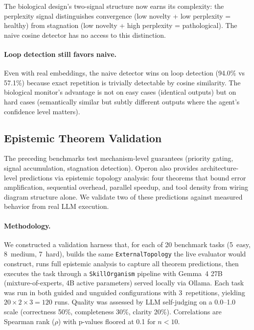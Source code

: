 The biological design's two-signal structure now earns its complexity:
the perplexity signal distinguishes convergence (low novelty + low
perplexity = healthy) from stagnation (low novelty + high perplexity =
pathological).  The naive cosine detector has no access to this
distinction.

\paragraph{Loop detection still favors naive.}
Even with real embeddings, the naive detector wins on loop detection
(94.0\% vs 57.1\%) because exact repetition is trivially detectable by
cosine similarity.  The biological monitor's advantage is not on easy
cases (identical outputs) but on hard cases (semantically similar but
subtly different outputs where the agent's confidence level matters).

\subsection{Epistemic Theorem Validation}\label{sec:topology-validation}

The preceding benchmarks test mechanism-level guarantees (priority
gating, signal accumulation, stagnation detection).  Operon also
provides architecture-level predictions via epistemic topology analysis:
four theorems that bound error amplification, sequential overhead,
parallel speedup, and tool density from wiring diagram structure alone.
We validate two of these predictions against measured behavior from real
LLM execution.

\paragraph{Methodology.}
We constructed a validation harness that, for each of 20 benchmark tasks
(5~easy, 8~medium, 7~hard), builds the same \texttt{ExternalTopology}
the live evaluator would construct, runs full epistemic analysis to
capture all theorem predictions, then executes the task through a
\texttt{SkillOrganism} pipeline with Gemma~4 27B (mixture-of-experts,
4B active parameters) served locally via Ollama.  Each task was run in
both guided and unguided configurations with 3~repetitions, yielding
$20 \times 2 \times 3 = 120$ runs.  Quality was assessed by LLM
self-judging on a 0.0--1.0 scale (correctness 50\%, completeness 30\%,
clarity 20\%).  Correlations are Spearman rank ($\rho$) with p-values
floored at 0.1 for $n < 10$.

